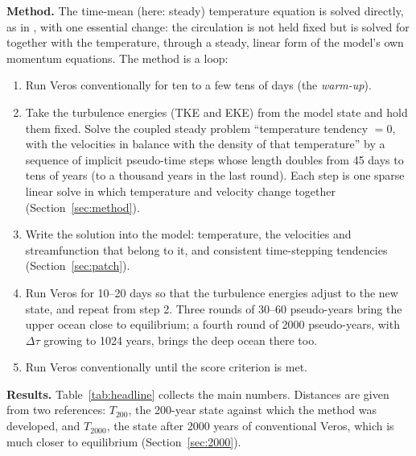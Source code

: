 \documentclass{article}
\begin{document}
\textbf{Method.} The time-mean (here: steady) temperature equation is solved directly, as in \citet{cooper2017}, with one essential change: the circulation is not held fixed but is solved for together with the temperature, through a steady, linear form of the model's own momentum equations. The method is a loop:
\begin{enumerate}
\item Run Veros conventionally for ten to a few tens of days (the \emph{warm-up}).
\item Take the turbulence energies (TKE and EKE) from the model state and hold them fixed. Solve the coupled steady problem ``temperature tendency $=0$, with the velocities in balance with the density of that temperature'' by a sequence of implicit pseudo-time steps whose length doubles from 45 days to tens of years (to a thousand years in the last round). Each step is one sparse linear solve in which temperature and velocity change together (Section~\ref{sec:method}).
\item Write the solution into the model: temperature, the velocities and streamfunction that belong to it, and consistent time-stepping tendencies (Section~\ref{sec:patch}).
\item Run Veros for 10--20 days so that the turbulence energies adjust to the new state, and repeat from step 2. Three rounds of 30--60 pseudo-years bring the upper ocean close to equilibrium; a fourth round of 2000 pseudo-years, with $\Delta\tau$ growing to 1024 years, brings the deep ocean there too.
\item Run Veros conventionally until the score criterion is met.
\end{enumerate}

\textbf{Results.} Table~\ref{tab:headline} collects the main numbers. Distances are given from two references: $T_{200}$, the 200-year state against which the method was developed, and $T_{2000}$, the state after 2000 years of conventional Veros, which is much closer to equilibrium (Section~\ref{sec:2000}).
\end{document}
